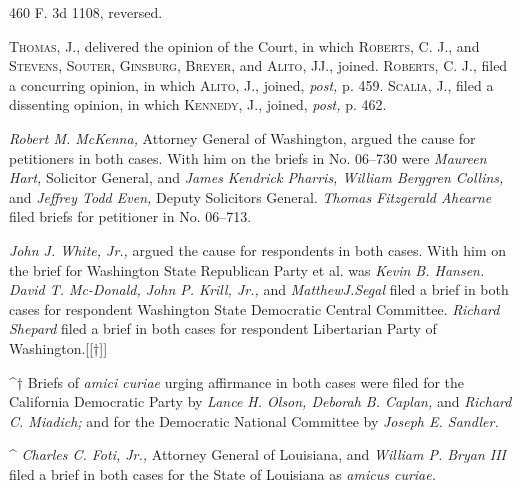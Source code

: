 460 F. 3d 1108, reversed.

  \textsc{Thomas,} J., delivered the opinion of the Court, in which
\textsc{Roberts,} C. J., and \textsc{Stevens, Souter, Ginsburg, Breyer,} and
\textsc{Alito,} JJ., joined. \textsc{Roberts,} C. J., filed a concurring opinion,
in which \textsc{Alito,} J., joined, \emph{post,} p. 459. \textsc{Scalia,}
J., filed a dissenting opinion, in which \textsc{Kennedy,} J., joined,
\emph{post,} p. 462.

  \emph{Robert M. McKenna,} Attorney General of Washington, argued the
cause for petitioners in both cases. With him on \newpage  the briefs
in No. 06--730 were \emph{Maureen Hart,} Solicitor General, and \emph{James
Kendrick Pharris, William Berggren Collins,} and \emph{Jeffrey Todd Even,}
Deputy Solicitors General. \emph{Thomas Fitzgerald Ahearne} filed briefs
for petitioner in No. 06--713.

  \emph{John J. White, Jr.,} argued the cause for respondents in both
cases. With him on the brief for Washington State Republican Party et
al. was \emph{Kevin B. Hansen. David T. Mc-Donald, John P. Krill, Jr.,} and
\emph{MatthewJ.Segal} filed a brief in both cases for respondent Washington
State Democratic Central Committee. \emph{Richard Shepard} filed a brief in
both cases for respondent Libertarian Party of Washington.[[†]]

^† Briefs of \emph{amici curiae} urging affirmance in both cases were
filed for the California Democratic Party by \emph{Lance H. Olson, Deborah
B. Caplan,} and \emph{Richard C. Miadich;} and for the Democratic National
Committee by \emph{Joseph E. Sandler.}

^   \emph{Charles C. Foti, Jr.,} Attorney General of Louisiana, and \emph{William
P. Bryan III} filed a brief in both cases for the State of Louisiana as
\emph{amicus curiae.}
